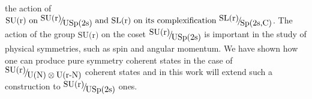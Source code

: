 \documentclass{amsart}
\begin{document}
the action of $\mbox{SU(r) on }\raise0.7ex\hbox{${\mbox{SU(r)}}$}
\!\mathord{\left/ {\vphantom {{\mbox{SU(r)}}
{\mbox{USp(2s)}}}}\right.\kern-\nulldelimiterspace}\!\lower0.7ex\hbox{${\mbox{USp(2s)}}$}\mbox{
and SL(r) on its complexification }\raise0.7ex\hbox{${\mbox{SL(r)}}$}
\!\mathord{\left/ {\vphantom {{\mbox{SL(r)}}
{\mbox{Sp(2s,C)}}}}\right.\kern-\nulldelimiterspace}\!\lower0.7ex\hbox{${\mbox{Sp(2s,C)}}$}$.
The action of the group $\mbox{SU(r)}$ on the coset
$\raise0.7ex\hbox{${\mbox{SU(r)}}$} \!\mathord{\left/ {\vphantom
{{\mbox{SU(r)}}
{\mbox{USp(2s)}}}}\right.\kern-\nulldelimiterspace}\!\lower0.7ex\hbox{${\mbox{USp(2s)}}$}$
is important in the study of physical symmetries, such as spin and angular
momentum. We have shown how one can produce pure symmetry coherent states in
the case of $\raise0.7ex\hbox{${\mbox{SU(r)}}$} \!\mathord{\left/ {\vphantom
{{\mbox{SU(r)}} {\mbox{U(N)}\otimes
\mbox{U(r-N)}}}}\right.\kern-\nulldelimiterspace}\!\lower0.7ex\hbox{${\mbox{U(N)}\otimes
\mbox{U(r-N)}}$}$ coherent states and in this work will extend such a
construction to $\raise0.7ex\hbox{${\mbox{SU(r)}}$} \!\mathord{\left/
{\vphantom {{\mbox{SU(r)}}
{\mbox{USp(2s)}}}}\right.\kern-\nulldelimiterspace}\!\lower0.7ex\hbox{${\mbox{USp(2s)}}$}$
ones.
\end{document}
